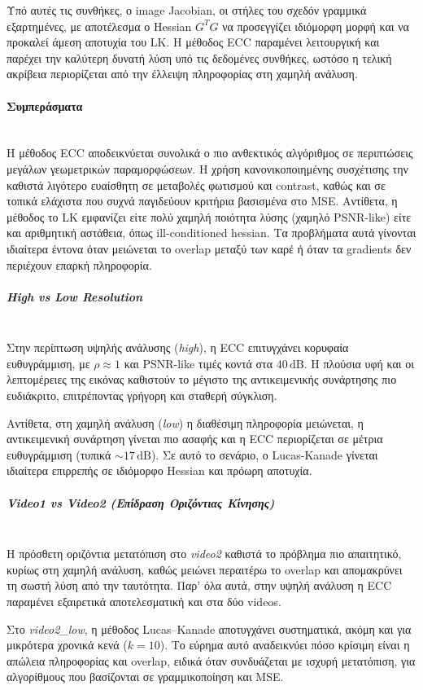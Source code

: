 \documentclass[12pt]{article}
\begin{document}
Υπό αυτές τις συνθήκες, ο image Jacobian, οι στήλες του σχεδόν γραμμικά εξαρτημένες, με αποτέλεσμα ο Hessian \(G^T G\) να προσεγγίζει ιδιόμορφη μορφή και να προκαλεί άμεση αποτυχία του LK. 
Η μέθοδος ECC παραμένει λειτουργική και παρέχει την καλύτερη δυνατή λύση υπό τις δεδομένες συνθήκες, ωστόσο η τελική ακρίβεια περιορίζεται από την έλλειψη πληροφορίας στη χαμηλή ανάλυση.


\paragraph{Συμπεράσματα}
\mbox{}\\
Η μέθοδος ECC αποδεικνύεται συνολικά ο πιο ανθεκτικός αλγόριθμος σε περιπτώσεις μεγάλων γεωμετρικών παραμορφώσεων. Η χρήση κανονικοποιημένης συσχέτισης 
την καθιστά λιγότερο ευαίσθητη σε μεταβολές φωτισμού και contrast, 
καθώς και σε τοπικά ελάχιστα που συχνά παγιδεύουν κριτήρια βασισμένα στο MSE.
Αντίθετα, η μέθοδος το LK εμφανίζει είτε πολύ χαμηλή ποιότητα λύσης (χαμηλό PSNR-like) είτε και αριθμητική αστάθεια, όπως ill-conditioned hessian. 
Τα προβλήματα αυτά γίνονται ιδιαίτερα έντονα όταν μειώνεται το overlap μεταξύ των καρέ ή όταν τα gradients δεν περιέχουν επαρκή πληροφορία.

\subparagraph{High vs Low Resolution}
\mbox{}\\
Στην περίπτωση υψηλής ανάλυσης (\textit{high}), η ECC επιτυγχάνει κορυφαία ευθυγράμμιση, με \(\rho \approx 1\) και PSNR-like τιμές κοντά στα 
\(40\,\text{dB}\). Η πλούσια υφή και οι λεπτομέρειες της εικόνας καθιστούν το μέγιστο της αντικειμενικής συνάρτησης πιο ευδιάκριτο, 
επιτρέποντας γρήγορη και σταθερή σύγκλιση.

Αντίθετα, στη χαμηλή ανάλυση (\textit{low}) η διαθέσιμη πληροφορία μειώνεται, η αντικειμενική συνάρτηση γίνεται πιο ασαφής και η ECC περιορίζεται σε 
μέτρια ευθυγράμμιση (τυπικά \(\sim 17\,\text{dB}\)). Σε αυτό το σενάριο, ο Lucas-Kanade γίνεται ιδιαίτερα επιρρεπής σε ιδιόμορφο Hessian και πρόωρη 
αποτυχία.

\subparagraph{Video1 vs Video2 (Επίδραση Οριζόντιας Κίνησης)}
\mbox{}\\
Η πρόσθετη οριζόντια μετατόπιση στο \textit{video2} καθιστά το πρόβλημα πιο απαιτητικό, κυρίως στη χαμηλή ανάλυση, καθώς μειώνει περαιτέρω το overlap
 και απομακρύνει τη σωστή λύση από την ταυτότητα. Παρ' όλα αυτά, στην υψηλή ανάλυση η ECC παραμένει εξαιρετικά αποτελεσματική και στα δύο videos.

Στο \textit{video2\_low}, η μέθοδος Lucas--Kanade αποτυγχάνει συστηματικά, ακόμη και για μικρότερα χρονικά κενά (\(k=10\)). 
Το εύρημα αυτό αναδεικνύει πόσο κρίσιμη είναι η απώλεια πληροφορίας και overlap, ειδικά όταν συνδυάζεται με ισχυρή μετατόπιση, για αλγορίθμους που βασίζονται σε γραμμικοποίηση και MSE.
\end{document}
